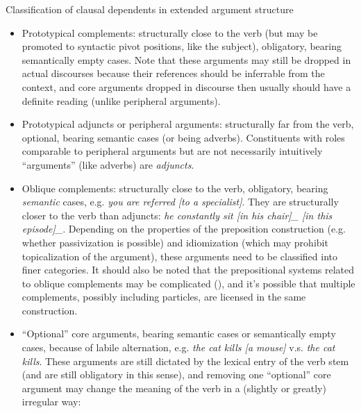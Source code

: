 \documentclass[UTF8, a4paper, oneside, scheme=plain, 12pt]{ctexbook}
\newcommand*{\term}[1]{\emph{#1}}
\newcommand{\form}[1]{\emph{#1}}
\begin{document}
\begin{table}[H]
    \caption{Classification of clausal dependents in extended argument structure}
    \label{tbl:argument-classification-general}
    \begin{itemize}
        \item Prototypical complements: 
        structurally close to the verb
        (but may be promoted to syntactic pivot positions, like the subject),
        obligatory, bearing semantically empty cases.
        Note that these arguments may still be dropped in actual discourses
        because their references should be inferrable from the context,
        and core arguments dropped in discourse then usually should have a definite reading
        (unlike peripheral arguments).
        \item Prototypical adjuncts or peripheral arguments:
        structurally far from the verb,
        optional, bearing semantic cases (or being adverbs).
        Constituents with roles comparable to peripheral arguments 
        but are not necessarily intuitively ``arguments'' (like adverbs)
        are \term{adjuncts}.
        \item Oblique complements:
        structurally close to the verb,
        obligatory, bearing \emph{semantic} cases,
        e.g. \form{you are referred [to a specialist]}.
        They are structurally closer to the verb than adjuncts:
        \form{he constantly sit [in his chair]_{} [in this episode]_{\text{adjunct}}}.
        Depending on the properties of the preposition construction
        (e.g. whether passivization is possible)
        and idiomization (which may prohibit topicalization of the argument),
        these arguments need to be classified into finer categories.
        It should also be noted that the prepositional systems related to oblique complements 
        may be complicated (),
        and it's possible that multiple complements, possibly including particles,
        are licensed in the same construction.
        \item ``Optional'' core arguments, bearing semantic cases or semantically empty cases,
        because of labile alternation,
        e.g. \form{the cat kills [a mouse]} v.s. \form{the cat kills}.
        These arguments are still dictated by the lexical entry of the verb stem
        (and are still obligatory in this sense),
        and removing one ``optional''  core argument
        may change the meaning of the verb in a (slightly or greatly) irregular way:

\end{itemize}
\end{table}
\end{document}
